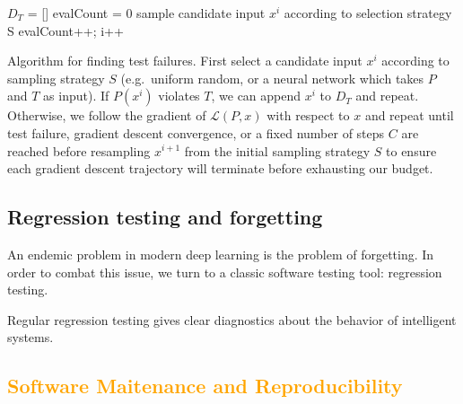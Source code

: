 \documentclass[12pt,initial,twoside,maitrise]{dms}
\newcommand{\mediumrare}[1]{\textcolor{orange}{#1}}
\numberwithin{equation}{section}
\numberwithin{table}{chapter}
\numberwithin{figure}{chapter}
\begin{document}
\begin{algorithm}

    $D_T$ = []\;
    evalCount = 0\;
     {
    sample candidate input $x^i$ according to selection strategy S\;
    evalCount++; i++\;
    }

    \caption{Algorithm for finding test failures. First select a candidate input $x^i$ according to sampling strategy $S$ (e.g.\ uniform random, or a neural network which takes $P$ and $T$ as input). If $P(x^i)$ violates $T$, we can append $x^i$ to $D_T$ and repeat. Otherwise, we follow the gradient of $\mathcal{L}(P, x)$ with respect to $x$ and repeat until test failure, gradient descent convergence, or a fixed number of steps $C$ are reached before resampling $x^{i+1}$ from the initial sampling strategy $S$ to ensure each gradient descent trajectory will terminate before exhausting our budget.}
\end{algorithm}

\section{Regression testing and forgetting}

An endemic problem in modern deep learning is the problem of forgetting. In order to combat this issue, we turn to a classic software testing tool: regression testing.

Regular regression testing gives clear diagnostics about the behavior of intelligent systems.

\mediumrare{\chapter{Software Maitenance and Reproducibility}\label{ch:ducker}}
\end{document}
